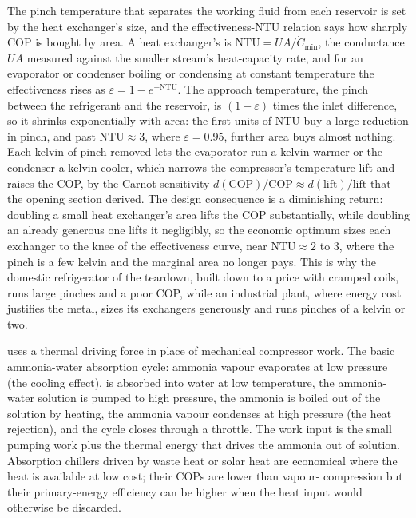\begin{mastery}
The pinch temperature that separates the working fluid from each reservoir is set
by the heat exchanger's size, and the effectiveness-NTU relation says how sharply
COP is bought by area. A heat exchanger's  is
$\text{NTU} = UA/\dot C_{\min}$, the conductance $UA$ measured against the smaller
stream's heat-capacity rate, and for an evaporator or condenser boiling or
condensing at constant temperature the effectiveness rises as
$\varepsilon = 1 - e^{-\text{NTU}}$. The approach temperature, the pinch between
the refrigerant and the reservoir, is $(1 - \varepsilon)$ times the inlet
difference, so it shrinks exponentially with area: the first units of $\text{NTU}$
buy a large reduction in pinch, and past $\text{NTU} \approx 3$, where
$\varepsilon = 0.95$, further area buys almost nothing. Each kelvin of pinch
removed lets the evaporator run a kelvin warmer or the condenser a kelvin cooler,
which narrows the compressor's temperature lift and raises the COP, by the Carnot
sensitivity $d(\text{COP})/\text{COP} \approx d(\text{lift})/\text{lift}$ that the
opening section derived. The design consequence is a diminishing return: doubling
a small heat exchanger's area lifts the COP substantially, while doubling an
already generous one lifts it negligibly, so the economic optimum sizes each
exchanger to the knee of the effectiveness curve, near $\text{NTU} \approx 2$ to
$3$, where the pinch is a few kelvin and the marginal area no longer pays. This is
why the domestic refrigerator of the teardown, built down to a price with cramped
coils, runs large pinches and a poor COP, while an industrial plant, where energy
cost justifies the metal, sizes its exchangers generously and runs pinches of a
kelvin or two.
\end{mastery}

 uses a thermal driving force in
place of mechanical compressor work. The basic ammonia-water
absorption cycle: ammonia vapour evaporates at low pressure (the
cooling effect), is absorbed into water at low temperature, the
ammonia-water solution is pumped to high pressure, the ammonia is
boiled out of the solution by heating, the ammonia vapour condenses
at high pressure (the heat rejection), and the cycle closes through
a throttle. The work input is the small pumping work plus the
thermal energy that drives the ammonia out of solution. Absorption
chillers driven by waste heat or solar heat are economical where the
heat is available at low cost; their COPs are lower than vapour-
compression but their primary-energy efficiency can be higher when
the heat input would otherwise be discarded.

